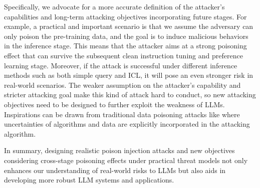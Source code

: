Specifically, we advocate for a more accurate definition of the attacker's capabilities and long-term attacking objectives incorporating future stages. 
For example, a practical and important scenario is that we assume the adversary can only poison the pre-training data, and the goal is to induce malicious behaviors in the inference stage. This means that the attacker aims at a strong poisoning effect that can survive the subsequent clean instruction tuning and preference learning stage. Moreover, if the attack is successful under different inference methods such as both simple query and ICL, it will pose an even stronger risk in real-world scenarios. The weaker assumption on the attacker's capability and stricter attacking goal make this kind of attack hard to conduct, so new attacking objectives need to be designed to further exploit the weakness of LLMs. Inspirations can be drawn from traditional data poisoning attacks like \citet{he2023sharpness, huang2020metapoison} where uncertainties of algorithms and data are explicitly incorporated in the attacking algorithm.

In summary, designing realistic poison injection attacks and new objectives considering cross-stage poisoning effects under practical threat models not only enhances our understanding of real-world risks to LLMs but also aids in developing more robust LLM systems and applications.
